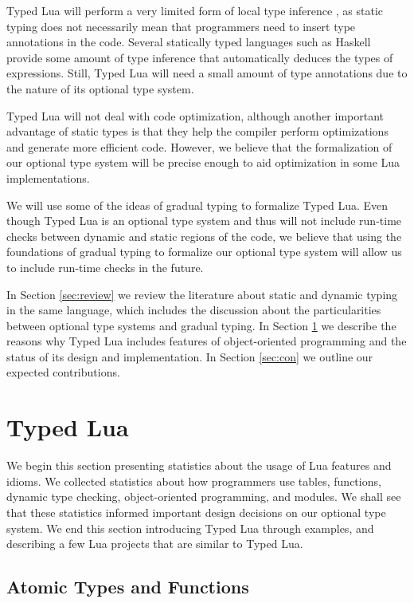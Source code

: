 \documentclass[preprint]{sig-alternate}
\begin{document}
Typed Lua will perform a very limited form of local type inference
\citep{pierce2000lti}, as static typing does not necessarily mean
that programmers need to insert type annotations in the code.
Several statically typed languages such as Haskell provide some
amount of type inference that automatically deduces the types of
expressions.
Still, Typed Lua will need a small amount of type annotations due
to the nature of its optional type system.

Typed Lua will not deal with code optimization, although another
important advantage of static types is that they help the compiler
perform optimizations and generate more efficient code.
However, we believe that the formalization of our optional type
system will be precise enough to aid optimization in some Lua
implementations.

We will use some of the ideas of gradual typing to formalize Typed Lua.
Even though Typed Lua is an optional type system and thus will not
include run-time checks between dynamic and static regions of the
code, we believe that using the foundations of gradual typing to
formalize our optional type system will allow us to include run-time
checks in the future.

In Section \ref{sec:review} we review the literature about static and
dynamic typing in the same language, which includes the discussion
about the particularities between optional type systems and gradual
typing.
In Section \ref{sec:proposal} we describe the reasons why Typed Lua
includes features of object-oriented programming and the status of
its design and implementation.
In Section \ref{sec:con} we outline our expected contributions.

\section{Typed Lua} \label{sec:proposal}

We begin this section presenting statistics about the usage of Lua
features and idioms.
We collected statistics about how programmers use tables, functions,
dynamic type checking, object-oriented programming, and modules.
We shall see that these statistics informed important design decisions
on our optional type system.
We end this section introducing Typed Lua through examples, and
describing a few Lua projects that are similar to Typed Lua. 

\subsection{Atomic Types and Functions}
\end{document}
